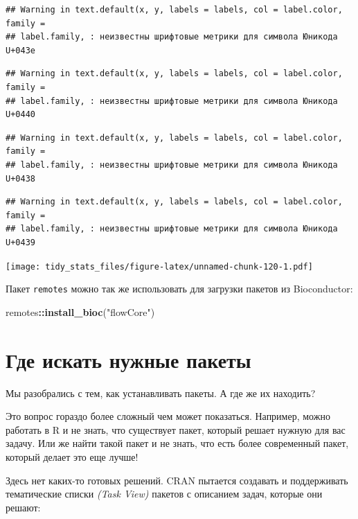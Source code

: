 \documentclass[]{book}
\newenvironment{Shaded}{\begin{snugshade}}{\end{snugshade}}
\newcommand{\KeywordTok}[1]{\textcolor[rgb]{0.13,0.29,0.53}{\textbf{#1}}}
\newcommand{\StringTok}[1]{\textcolor[rgb]{0.31,0.60,0.02}{#1}}
\newcommand{\OperatorTok}[1]{\textcolor[rgb]{0.81,0.36,0.00}{\textbf{#1}}}
\newcommand{\NormalTok}[1]{#1}
\begin{document}
\begin{verbatim}
## Warning in text.default(x, y, labels = labels, col = label.color, family =
## label.family, : неизвестны шрифтовые метрики для символа Юникода U+043e
\end{verbatim}

\begin{verbatim}
## Warning in text.default(x, y, labels = labels, col = label.color, family =
## label.family, : неизвестны шрифтовые метрики для символа Юникода U+0440
\end{verbatim}

\begin{verbatim}
## Warning in text.default(x, y, labels = labels, col = label.color, family =
## label.family, : неизвестны шрифтовые метрики для символа Юникода U+0438
\end{verbatim}

\begin{verbatim}
## Warning in text.default(x, y, labels = labels, col = label.color, family =
## label.family, : неизвестны шрифтовые метрики для символа Юникода U+0439
\end{verbatim}

\texttt{[image: tidy\_stats\_files/figure-latex/unnamed-chunk-120-1.pdf]}

Пакет \texttt{remotes} можно так же использовать для загрузки пакетов из
Bioconductor:

\begin{Shaded}
\begin{Highlighting}[]
\NormalTok{remotes}\OperatorTok{::}\KeywordTok{install_bioc}\NormalTok{(}\StringTok{"flowCore"}\NormalTok{)}
\end{Highlighting}
\end{Shaded}

\section{Где искать нужные пакеты}\label{where_packages}

Мы разобрались с тем, как устанавливать пакеты. А где же их находить?

Это вопрос гораздо более сложный чем может показаться. Например, можно
работать в R и не знать, что существует пакет, который решает нужную для
вас задачу. Или же найти такой пакет и не знать, что есть более
современный пакет, который делает это еще лучше!

Здесь нет каких-то готовых решений. CRAN пытается создавать и
поддерживать тематические списки \emph{(Task View)} пакетов с описанием
задач, которые они решают:
\end{document}
